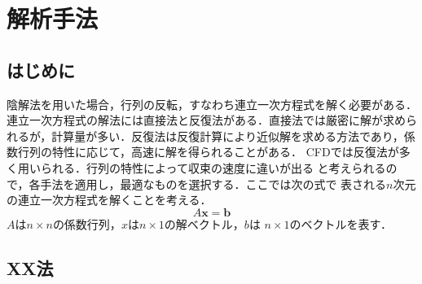 \chapter{解析手法}
\label{chap:simulation}

\section{はじめに}
陰解法を用いた場合，行列の反転，すなわち連立一次方程式を解く必要がある．
連立一次方程式の解法には直接法と反復法がある．直接法では厳密に解が求めら
れるが，計算量が多い．反復法は反復計算により近似解を求める方法であり，係
数行列の特性に応じて，高速に解を得られることがある．
CFDでは反復法が多く用いられる．行列の特性によって収束の速度に違いが出る
と考えられるので，各手法を適用し，最適なものを選択する．ここでは次の式で
表される$n$次元の連立一次方程式を解くことを考える．
\begin{equation}
 A\bm{x}=\bm{b}
\label{eq:linear}
\end{equation}
$A$は$n\times n$の係数行列，$x$は$n\times1$の解ベクトル，$b$は
$n\times1$のベクトルを表す．

\section{XX法}
